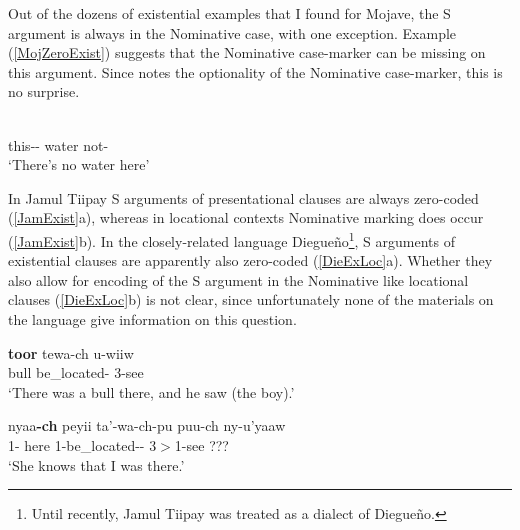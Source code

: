 
Out of the dozens of existential examples that I found for Mojave, the S argument is always in the Nominative case, with one exception.
Example (\ref{MojZeroExist}) suggests that the Nominative case-marker can be missing on this argument. 
Since \citet{Munro:1976} notes the optionality of the Nominative case-marker, this is no surprise. 


\begin{exe}\ex\label{MojZeroExist}
\gll{}  \\
this-\dem{}-\loc{} water not-\tns{}\\
\glt `There's no water here'
\end{exe} 

In Jamul Tiipay S arguments of presentational clauses are always zero-coded (\ref{JamExist}a), whereas in locational contexts Nominative marking does occur (\ref{JamExist}b). 
In the closely-related language Diegue\~no\footnote{Until recently, Jamul Tiipay was treated as a dialect of Diegue\~no.}, S arguments of existential clauses are apparently also zero-coded (\ref{DieExLoc}a). Whether they also allow for encoding of the S argument in the Nominative like locational clauses (\ref{DieExLoc}b) is not clear, since unfortunately none of the materials on the language give information on this question. 

\begin{exe}\ex\label{JamExist}
 \begin{xlist}
\ex\gll \textbf{toor} tewa-ch u-wiiw\\
bull be\_located-\ssbj{} 3-see\\
\glt `There was a bull there, and he saw (the boy).'

\ex\gll nyaa\textbf{-ch} peyii ta'-wa-ch-pu puu-ch ny-u'yaaw\\
1-\nom{} here 1-be\_located-\NR{}-\dem{} 3$>$1-see {???}\\
\glt `She knows that I was there.' 
\end{xlist}
\end{exe}

